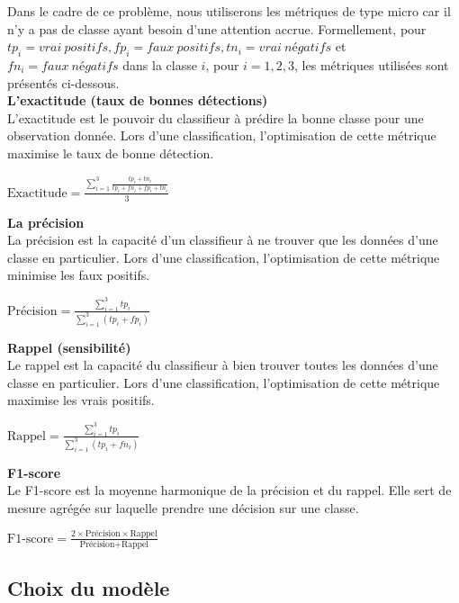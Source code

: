 Dans le cadre de ce problème, nous utiliserons les métriques de type micro car il n'y a pas de classe ayant besoin d'une attention accrue. Formellement, pour $tp_i = vrai~positifs, fp_i = faux~positifs, tn_i = vrai~négatifs$ et $fn_i = faux~négatifs$ dans la classe $i$, pour $i = 1, 2, 3$, les métriques utilisées sont présentés ci-dessous.\\

\textbf{L'exactitude (taux de bonnes détections)}\\
L'exactitude est le pouvoir du classifieur à prédire la bonne classe pour une observation donnée. Lors d'une classification, l'optimisation de cette métrique maximise le taux de bonne détection.\\
\begin{center}
	$\textrm{Exactitude} = \frac{\sum_{i=1}^{3} \frac{tp_i +tn_i}{tp_i + fn_i + fp_i+ tn_i}}{3}$
\end{center}

\textbf{La précision}\\
La précision est la capacité d'un classifieur à ne trouver que les données d'une classe en particulier. Lors d'une classification, l'optimisation de cette métrique minimise les faux positifs.\\
\begin{center}
	$\textrm{Précision} = \frac{\sum_{i=1}^{3} tp_i}{\sum_{i=1}^{3} (tp_i + fp_i)}$
\end{center}

\textbf{Rappel (sensibilité)}\\
Le rappel est la capacité du classifieur à bien trouver toutes les données d'une classe en particulier. Lors d'une classification, l'optimisation de cette métrique maximise les vrais positifs.\\
\begin{center}
	$\textrm{Rappel} = \frac{\sum_{i=1}^{3} tp_i}{\sum_{i=1}^{3} (tp_i + fn_i)}$
\end{center}

\textbf{F1-score}\\
Le F1-score est la moyenne harmonique de la précision et du rappel. Elle sert de mesure agrégée sur laquelle prendre une décision sur une classe.\\	
\begin{center}
	$\textrm{F1-score} = \frac{2 \times \textrm{Précision} \times \textrm{Rappel}}{\textrm{Précision} + \textrm{Rappel}}$ 
\end{center}

\subsection{Choix du modèle}

